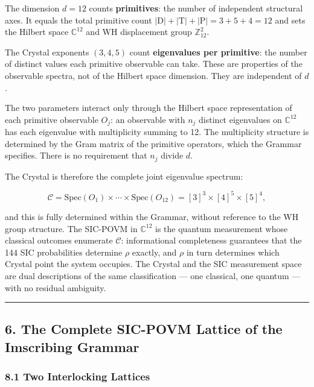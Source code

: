 \documentclass[12pt,a4paper]{article}
\begin{document}
The dimension \(d=12\) counts \textbf{primitives}: the number of
independent structural axes. It equals the total primitive count
\(|\mathrm{D}| + |\mathrm{T}| + |\mathrm{P}| = 3 + 5 + 4 = 12\) and sets
the Hilbert space \(\mathbb{C}^{12}\) and WH displacement group
\(\mathbb{Z}_{12}^2\).

The Crystal exponents \((3, 4, 5)\) count \textbf{eigenvalues per
primitive}: the number of distinct values each primitive observable can
take. These are properties of the observable spectra, not of the Hilbert
space dimension. They are independent of \(d\).

The two parameters interact only through the Hilbert space
representation of each primitive observable \(O_j\): an observable with
\(n_j\) distinct eigenvalues on \(\mathbb{C}^{12}\) has each eigenvalue
with multiplicity summing to 12. The multiplicity structure is
determined by the Gram matrix of the primitive operators, which the
Grammar specifies. There is no requirement that \(n_j\) divide \(d\).

The Crystal is therefore the complete joint eigenvalue spectrum:

\[\mathcal{C} = \mathrm{Spec}(O_1) \times \cdots \times \mathrm{Spec}(O_{12}) = [3]^3 \times [4]^5 \times [5]^4,\]

and this is fully determined within the Grammar, without reference to
the WH group structure. The SIC-POVM in \(\mathbb{C}^{12}\) is the
quantum measurement whose classical outcomes enumerate \(\mathcal{C}\):
informational completeness guarantees that the 144 SIC probabilities
determine \(\rho\) exactly, and \(\rho\) in turn determines which
Crystal point the system occupies. The Crystal and the SIC measurement
space are dual descriptions of the same classification --- one
classical, one quantum --- with no residual ambiguity.

\begin{center}\rule{0.5\linewidth}{0.5pt}\end{center}

\hypertarget{the-complete-sic-povm-lattice-of-the-imscribing-grammar}{%
\subsection{6. The Complete SIC-POVM Lattice of the Imscribing
Grammar}\label{the-complete-sic-povm-lattice-of-the-imscribing-grammar}}

\hypertarget{two-interlocking-lattices}{%
\subsubsection{8.1 Two Interlocking
Lattices}\label{two-interlocking-lattices}}
\end{document}
